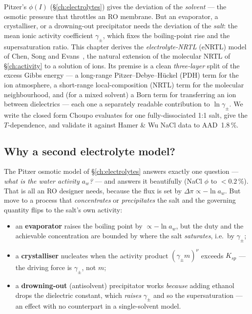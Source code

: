 \documentclass[11pt,a4paper]{article}
\begin{document}
\begin{whatyoulllearn}
Pitzer's $\phi(I)$ (\S\ref{ch:electrolytes}) gives the deviation of the
\emph{solvent} --- the osmotic pressure that throttles an RO membrane.
But an evaporator, a crystalliser, or a drowning-out precipitator needs
the deviation of the \emph{salt}: the mean ionic activity coefficient
$\gamma_\pm$, which fixes the boiling-point rise and the supersaturation
ratio.  This chapter derives the \emph{electrolyte-NRTL} (eNRTL) model
of Chen, Song and Evans~\cite{ChenSongEvans1982,ChenEvans1986}, the
natural extension of the molecular NRTL of \S\ref{ch:activity} to a
solution of ions.  Its premise is a clean
\emph{three-layer} split of the excess Gibbs energy --- a long-range
Pitzer--Debye--H\"uckel (PDH) term for the ion atmosphere, a short-range
local-composition (NRTL) term for the molecular neighbourhood, and (for
a mixed solvent) a Born term for transferring an ion between dielectrics
--- each one a separately readable contribution to $\ln\gamma_\pm$.  We
write the closed form Choupo evaluates for one fully-dissociated 1:1
salt, give the $T$-dependence, and validate it against Hamer \& Wu NaCl
data to AAD~1.8\,\%.
\end{whatyoulllearn}

\subsection{Why a second electrolyte model?}

The Pitzer osmotic model of \S\ref{ch:electrolytes} answers exactly one
question --- \emph{what is the water activity $a_w$?} --- and answers it
beautifully (NaCl $\phi$ to $<0.2$\,\%).  That is all an RO designer
needs, because the flux is set by $\Delta\pi \propto -\ln a_w$.  But
move to a process that \emph{concentrates} or \emph{precipitates} the
salt and the governing quantity flips to the salt's own activity:

\begin{itemize}[leftmargin=*,nosep,topsep=2pt]
  \item an \textbf{evaporator} raises the boiling point by
        $\propto -\ln a_w$, but the duty and the achievable
        concentration are bounded by where the salt \emph{saturates},
        i.e.\ by $\gamma_\pm$;
  \item a \textbf{crystalliser} nucleates when the activity product
        $(\gamma_\pm m)^{\nu}$ exceeds $K_{sp}$ --- the driving force is
        $\gamma_\pm$, not $m$;
  \item a \textbf{drowning-out} (antisolvent) precipitator works
        \emph{because} adding ethanol drops the dielectric constant,
        which \emph{raises} $\gamma_\pm$ and so the supersaturation ---
        an effect with no counterpart in a single-solvent model.
\end{itemize}
\end{document}
